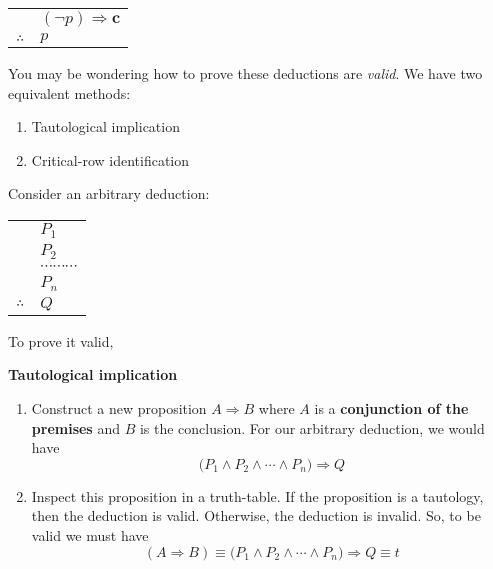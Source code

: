 \documentclass[main.tex]{subfiles}
\begin{document}
\begin{thm}
	\mbox{}
	\begin{center}
		\begin{tabular}{c@{\,}l@{}}
			& \((\lnot p) \Rightarrow \mathbf{c}\) \\
			\cline{2-2}
			\(\therefore\) & \(p\)
		\end{tabular}
	\end{center}
\end{thm}

You may be wondering how to prove these deductions are \textit{valid}. We have two equivalent methods:
\begin{enumerate}
	\item Tautological implication
	\item Critical-row identification
\end{enumerate}

Consider an arbitrary deduction:
\begin{center}
	\begin{tabular}{c@{\,}l@{}}
		& \(P_1\) \\
		& \(P_2\) \\
		& \(\cdots \cdots \cdots\) \\
		& \(P_n\) \\
		\cline{2-2}
		\(\therefore\) & \(Q\)
	\end{tabular}
\end{center}

To prove it valid,

\textbf{Tautological implication}
\begin{enumerate}
	\item Construct a new proposition \(A \Rightarrow B\) where \(A\) is a \textbf{conjunction of the premises} and \(B\) is the conclusion. For our arbitrary deduction, we would have \[\big( P_1 \land P_2 \land \cdots \land P_n \big) \Rightarrow Q\]
	\item Inspect this proposition in a truth-table. If the proposition is a tautology, then the deduction is valid. Otherwise, the deduction is invalid. So, to be valid we must have \[(A \Rightarrow B) \equiv \big( P_1 \land P_2 \land \cdots \land P_n \big) \Rightarrow Q \equiv t\]
\end{enumerate}
\end{document}
